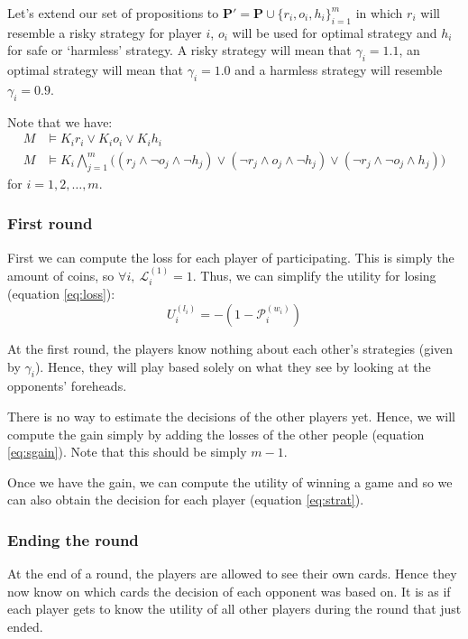 \documentclass[a4paper,10pt]{article}
\begin{document}
Let's extend our set of propositions to $\boldsymbol{P}'=\boldsymbol{P} \cup \{r_i,o_i,h_i\}_{i=1}^m$ in which $r_i$ will resemble a risky strategy for player $i$, $o_i$ will be used for optimal strategy and $h_i$ for safe or `harmless' strategy. A risky strategy will mean that $\gamma_i=1.1$, an optimal strategy will mean that $\gamma_i=1.0$ and a harmless strategy will resemble $\gamma_i=0.9$.

Note that we have:
\begin{align*}
 M &\models K_i r_i \vee K_i o_i \vee K_i h_i\\
 M &\models K_i \bigwedge_{j=1}^m\bigg( (r_j \wedge \neg o_j \wedge \neg h_j ) \vee
					(\neg r_j \wedge o_j \wedge \neg h_j) \vee
					(\neg r_j \wedge \neg o_j \wedge h_j)\bigg)
\end{align*}
for $i=1,2,\ldots,m$.

\subsubsection{First round}
First we can compute the loss for each player of participating. This is simply the amount of coins, so $\forall i,~\mathcal{L}^{(1)}_i=1$. Thus, we can simplify the utility for losing (equation \ref{eq:loss}):
\begin{equation}
U^{(l_i)}_i = -(1 - \mathcal{P}^{(w_i)}_i)
\end{equation}

At the first round, the players know nothing about each other's strategies (given by $\gamma_i$). Hence, they will play based solely on what they see by looking at the opponents' foreheads.

There is no way to estimate the decisions of the other players yet. Hence, we will compute the gain simply by adding the losses of the other people (equation \ref{eq:sgain}). Note that this should be simply $m-1$.

Once we have the gain, we can compute the utility of winning a game and so we can also obtain the decision for each player (equation \ref{eq:strat}).

\subsubsection{Ending the round}
At the end of a round, the players are allowed to see their own cards. Hence they now know on which cards the decision of each opponent was based on. It is as if each player gets to know the utility of all other players during the round that just ended.
\end{document}
